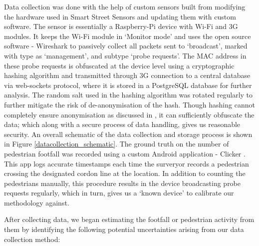 Data collection was done with the help of custom sensors built from modifying the hardware used in Smart Street Sensors \citep{sss2016} and updating them with custom software.
The sensor is essentially a Raspberry-Pi device with Wi-Fi and 3G modules.
It keeps the Wi-Fi module in `Monitor mode' and uses the open source software - Wireshark \citep{wireshark2} to passively collect all packets sent to `broadcast', marked with type as `management', and subtype `probe requests'.
The MAC address in these probe requests is obfuscated at the device level using a cryptographic hashing algorithm and transmitted through 3G connection to a central database via web-sockets protocol, where it is stored in a PostgreSQL database for further analysis.
The random salt used in the hashing algorithm was rotated regularly to further mitigate the risk of de-anonymisation of the hash.
Though hashing cannot completely ensure anonymisation as discussed in \citep{demir2014analysing}, it can sufficiently obfuscate the data; which along with a secure process of data handling, gives us reasonable security.
An overall schematic of the data collection and storage process is shown in Figure \ref{datacollection_schematic}.
The ground truth on the number of pedestrian footfall was recorded using a custom Android application - Clicker \citep{bala2018clicker}.
This app logs accurate timestamps each time the surveryor records a pedestrian crossing the designated cordon line at the location.
In addition to counting the pedestrians manually, this procedure results in the device broadcasting probe requests regularly, which in turn, gives us a `known device' to calibrate our methodology against.



After collecting data, we began estimating the footfall or pedestrian activity from them by identifying the following potential uncertainties arising from our data collection method:

